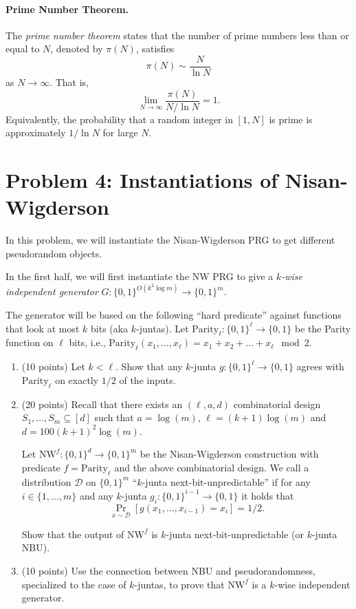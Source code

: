 \documentclass[12pt]{article}
\begin{document}
\paragraph{Prime Number Theorem.}
The \emph{prime number theorem} states that the number of prime numbers less than or equal to $N$, denoted by $\pi(N)$, satisfies
\[
\pi(N) \sim \frac{N}{\ln N}
\]
as $N \to \infty$. That is,
\[
\lim_{N \to \infty} \frac{\pi(N)}{N/\ln N} = 1.
\]
Equivalently, the probability that a random integer in $[1, N]$ is prime is approximately $1/\ln N$ for large $N$.

\newpage

\section{Problem 4: Instantiations of Nisan-Wigderson}

\newcommand{\B}{\{0,1\}}
\newcommand{\calD}{\mathcal{D}}
\newcommand{\calU}{\mathcal{U}}

In this problem, we will instantiate the Nisan-Wigderson PRG to get different pseudorandom objects. 

In the first half, we will first instantiate the NW PRG to give a \emph{$k$-wise independent generator} $G: \B^{O(k^2 \log m)} \to \B^m$. 

The generator will be based on the following ``hard predicate'' against functions that look at most $k$ bits (aka $k$-juntas). Let $\mathrm{Parity}_\ell: \B^{\ell} \to \B$ be the Parity function on $\ell$ bits, i.e., $\mathrm{Parity}_\ell(x_1, \ldots, x_{\ell}) = x_1 + x_2 + \ldots + x_{\ell} \mod 2$.
\begin{enumerate}
\item (10 points) Let $k<\ell$. Show that any $k$-junta $g: \B^{\ell} \to \B$ agrees with $\mathrm{Parity}_\ell$ on exactly $1/2$ of the inputs.
\item (20 points) Recall that there exists an $(\ell, a, d)$ combinatorial design $S_1, \ldots, S_m \subseteq[d]$ such that $a = \log(m)$, $\ell = (k+1)\log(m)$ and $d = 100 (k+1)^2 \log(m)$.

Let $\mathrm{NW}^{f}: \B^{d} \to \B^m$ be the Nisan-Wigderson construction with predicate $f = \mathrm{Parity}_\ell$ and the above combinatorial design.
We call a distribution $\calD$ on $\B^m$  ``$k$-junta next-bit-unpredictable'' if for any $i\in \{1,\ldots, m\}$ and any $k$-junta $g_i: \B^{i-1} \to \B$ it holds that  $$\Pr_{x\sim \calD}[g(x_1, \ldots, x_{i-1}) = x_i] = 1/2.$$

Show that the output of $\mathrm{NW}^{f}$ is $k$-junta next-bit-unpredictable (or $k$-junta NBU).

\item (10 points) Use the connection between NBU and pseudorandomness, specialized to the case of $k$-juntas, to prove that $\mathrm{NW}^f$ is a $k$-wise independent generator.
\end{enumerate}
\end{document}
